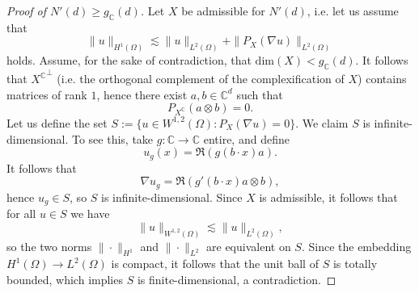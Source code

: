 \documentclass[11pt, a4paper, reqno]{elsarticle}
\theoremstyle{definition}
\theoremstyle{remark}
\begin{document}
\begin{proof}[Proof of $N'(d)\ge g_{\mathbb C}(d)$]
Let $X$ be admissible for $N'(d)$, i.e. let us assume that
\begin{equation*}
	\|u\|_{H^1(\Omega)}
\lesssim
	\|u\|_{L^2(\Omega)}
+
	\|P_X(\nabla u)\|_{L^2(\Omega)}
\end{equation*}
holds. Assume, for the sake of contradiction,
that $\mathrm{dim}(X)<g_\mathbb{C}(d)$.
It follows that ${X^{\mathbb{C}}}^\perp$
(i.e. the orthogonal complement of the complexification of $X$)
 contains matrices of rank $1$,
hence there exist $a,b\in \mathbb{C}^d$ such that
\begin{equation*}
	P_{X^\mathbb{C}}(a\otimes b)
=
	0.
\end{equation*}
Let us define the set $S:=\{u\in W^{1,2}(\Omega)\colon P_X(\nabla u)=0\}$.
We claim $S$ is infinite-dimensional. 
To see this, take $g\colon \mathbb{C}\to \mathbb{C}$ entire, and define
\begin{equation*}
    u_g(x)=\Re(g(b\cdot x)a).
\end{equation*}
It follows that
\begin{equation*}
    \nabla u_g=\Re(g'(b\cdot x)a\otimes b),
\end{equation*}
hence $u_g\in S$, so $S$ is infinite-dimensional. 
Since $X$ is admissible, it follows that for all $u\in S$ we have
\begin{equation*}
    \|u\|_{W^{1,2}(\Omega)}\lesssim \|u\|_{L^2(\Omega)},
\end{equation*}
so the two norms $\|\cdot\|_{H^1}$ and $\|\cdot \|_{L^2}$
are equivalent on $S$.
Since the embedding $H^1(\Omega)\to L^2(\Omega)$ is compact,
 it follows that the unit ball of $S$ is totally bounded,
which implies $S$ is finite-dimensional,
a contradiction.
\end{proof}
\end{document}
